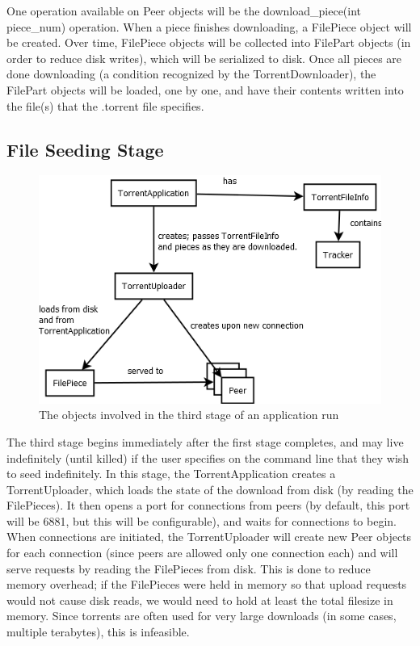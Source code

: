 \documentclass[letter]{scrartcl}
\begin{document}
One operation available on Peer objects will be the download\_piece(int piece\_num) operation.  When a piece finishes downloading, a FilePiece object will be created.  Over time, FilePiece objects will be collected into FilePart objects (in order to reduce disk writes), which will be serialized to disk.  Once all pieces are done downloading (a condition recognized by the TorrentDownloader), the FilePart objects will be loaded, one by one, and have their contents written into the file(s) that the .torrent file specifies.

\subsection{File Seeding Stage}
\begin{figure}[h]
\centering
\includegraphics[scale=.5]{stepThree.png}
\caption{The objects involved in the third stage of an application run}
\end{figure}

The third stage begins immediately after the first stage completes, and may live indefinitely (until killed) if the user specifies on the command line that they wish to seed indefinitely.  In this stage, the TorrentApplication creates a TorrentUploader, which loads the state of the download from disk (by reading the FilePieces).  It then opens a port for connections from peers (by default, this port will be 6881, but this will be configurable), and waits for connections to begin.  When connections are initiated, the TorrentUploader will create new Peer objects for each connection (since peers are allowed only one connection each) and will serve requests by reading the FilePieces from disk.  This is done to reduce memory overhead; if the FilePieces were held in memory so that upload requests would not cause disk reads, we would need to hold at least the total filesize in memory.  Since torrents are often used for very large downloads (in some cases, multiple terabytes), this is infeasible.
\end{document}
